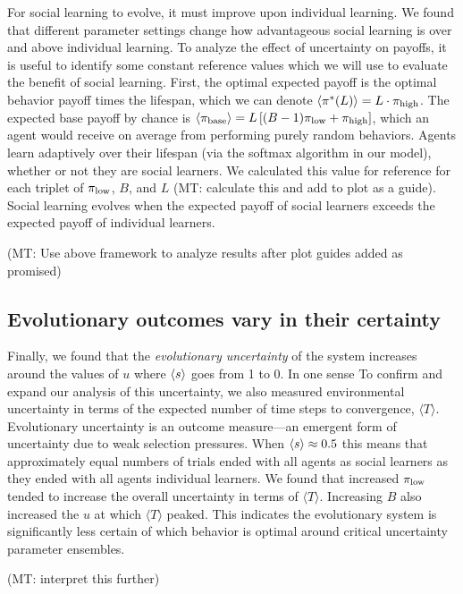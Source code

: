 \documentclass[letterpaper,11.5pt]{scrartcl}
\newcommand{\mt}[1]{{\textcolor{myorange} {({\tiny MT:} #1)}}}
\begin{document}
For social learning to evolve, it must improve upon individual learning. 
We found that different parameter settings change how advantageous social learning
is over and above individual learning. To analyze the effect of uncertainty on
payoffs, it is useful to identify some constant reference values which we will
use to evaluate the benefit of social learning. First, the optimal expected payoff
is the optimal behavior payoff times the lifespan, which we can denote
$\langle \pi^*(L) \rangle = L\cdot\pi_{\mathrm{high}}$. The expected base payoff by chance is 
$\langle \pi_{\text{base}} \rangle = L \left[ (B - 1) \pi_{\mathrm{low}} + \pi_{\mathrm{high}} \right]$, which
an agent would receive on average from performing purely random behaviors. 
Agents learn adaptively over their lifespan (via the softmax algorithm in 
our model), whether or not they are social learners. We calculated this
value for reference for each triplet of $\pi_{\mathrm{low}}$, $B$, and $L$ 
\mt{calculate this and add to plot as a guide}. 
Social learning evolves when the expected payoff of
social learners exceeds the expected payoff of individual learners.

\mt{Use above framework to analyze results after plot guides added as
promised}


\subsection{Evolutionary outcomes vary in their certainty} 

Finally, we found that the \emph{evolutionary uncertainty} of the system increases
around the values of $u$ where $\langle s \rangle$ goes from 1 to 0. 
In one sense
To confirm and expand our analysis of this uncertainty, we 
also measured environmental uncertainty in terms of the
expected number of time steps to convergence, $\langle T \rangle$. Evolutionary
uncertainty is an outcome measure---an emergent form of uncertainty due to
weak selection pressures. When 
$\langle s \rangle \approx 0.5$ this means that approximately equal numbers of trials
ended with all agents as social learners as they ended with all agents 
individual learners. We found that increased $\pi_{\mathrm{low}}$
tended to increase the overall uncertainty in terms of $\langle T \rangle$.
Increasing $B$ also increased the $u$ at which $\langle T \rangle$ peaked.
This indicates the evolutionary system is significantly less certain of 
which behavior is optimal around critical uncertainty parameter ensembles.

\mt{interpret this further}
\end{document}
